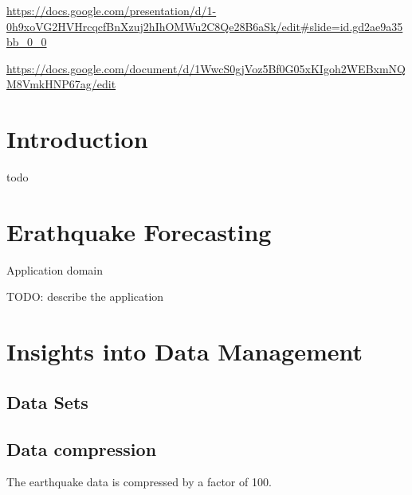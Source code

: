 \documentclass[utf8]{FrontiersinVancouver} %
\begin{document}
\url{https://docs.google.com/presentation/d/1-0h9xoVG2HVHrcqcfBnXzuj2hIhOMWu2C8Qe28B6aSk/edit#slide=id.gd2ae9a35bb_0_0}

\url{https://docs.google.com/document/d/1WwcS0gjVoz5Bf0G05xKIgoh2WEBxmNQM8VmkHNP67ag/edit}

\section{Introduction}

todo \citep{las-22-arxiv-workflow-cc}











\section{Erathquake Forecasting}

Application domain



TODO: describe the application



\section{Insights into Data Management}


\subsection{Data Sets}


\subsection{Data compression}


The earthquake data is compressed by a factor of 100.
\end{document}
